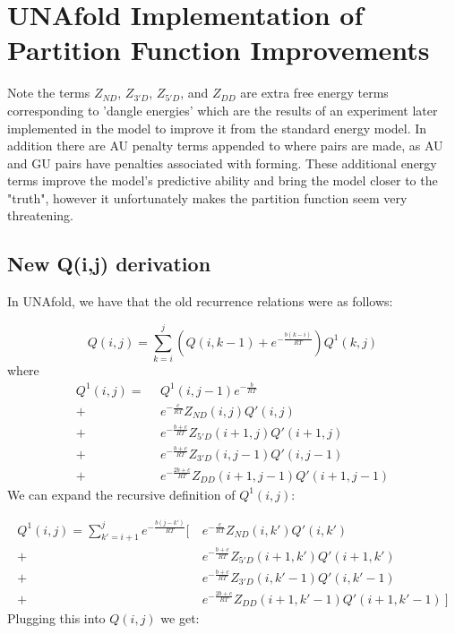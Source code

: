 \chapter{UNAfold Implementation of Partition Function Improvements}

Note the terms $Z_{ND}$, $Z_{3'D}$, $Z_{5'D}$, and $Z_{DD}$ are extra
free energy terms corresponding to 'dangle energies' which are the
results of an experiment later implemented in the model to improve it
from the standard energy model. In addition there are AU penalty terms
appended to where pairs are made, as AU and GU pairs have penalties
associated with forming. These additional energy terms improve the
model's predictive ability and bring the model closer to the "truth",
however it unfortunately makes the partition function seem very
threatening.


\section{New Q(i,j) derivation}

In UNAfold, we have that the old recurrence relations were as follows:

\begin{equation}
Q(i,j) = \sum_{k=i}^j \left ( Q(i, k-1) + e^{-\frac{b(k-i)}{RT}}  \right )Q^1(k, j)
\end{equation}
where 
\begin{equation}
\begin{split}
Q^1(i, j) = \ \ & Q^1(i, j - 1) e^{-\frac{b}{RT}}  \\
 +\ & e^{-\frac{c}{RT} }Z_{ND}(i, j) Q'(i, j)  \\
+\ & e^{-\frac{b + c}{RT}}Z_{5'D}(i + 1, j)Q'(i + 1, j)  \\
+\ &  e^{-\frac{b + c}{RT}}Z_{3'D}(i, j-1)Q'(i, j - 1)  \\
+\ &  e^{-\frac{2b + c}{RT}}Z_{DD}(i + 1, j-1)Q'(i + 1, j-1) 
\end{split}
\end{equation}
\noindent
We can expand the recursive definition of $Q^1(i,j)$:

\begin{equation}
\begin{split}
Q^1(i, j) = \sum_{k' = i + 1}^j e^{-\frac{b(j - k')}{RT} } \bigg [ \ 
  & e^{-\frac{c}{RT} }Z_{ND}(i, k') Q'(i, k') \\
 +\ & e^{-\frac{b + c}{RT}}Z_{5'D}(i + 1, k')Q'(i + 1, k') \\ 
+\  & e^{-\frac{b + c}{RT}}Z_{3'D}(i, k'-1)Q'(i, k' - 1) \\
+\  & e^{-\frac{2b + c}{RT}}Z_{DD}(i + 1, k'-1)Q'(i + 1, k'-1) \   \bigg ]
\end{split}
\end{equation}
\noindent
Plugging this into $Q(i,j)$ we get:


